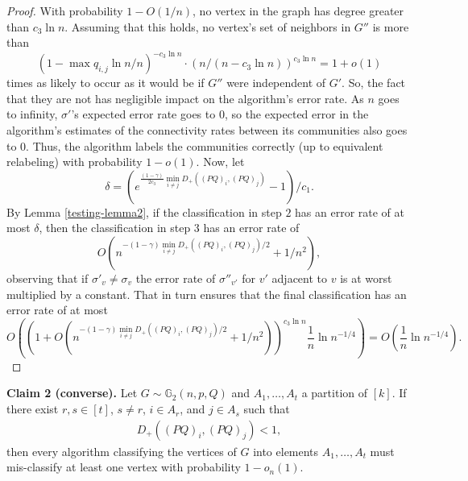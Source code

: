 \documentclass[11pt]{article}
\newcommand{\gs}{\mathbb{G}_2}
\newcommand{\dd}{D_+}
\newcommand{\1}{\mathbb{1}}
\begin{document}
\begin{proof}
With probability $1-O(1/n)$, no vertex in the graph has degree greater than $c_3\ln n$. Assuming that this holds, no vertex's set of neighbors in $G''$ is more than $$(1-\max q_{i,j} \ln n/n)^{-c_3\ln n}\cdot (n/(n-c_3\ln n))^{c_3\ln n}=1+o(1)$$ times as likely to occur as it would be if $G''$ were independent of $G'$. So, the fact that they are not has negligible impact on the algorithm's error rate. As $n$ goes to infinity, $\sigma'$'s expected error rate goes to $0$, so the expected error in the algorithm's estimates of the connectivity rates between its communities also goes to $0$. Thus, the algorithm labels the communities correctly (up to equivalent relabeling) with probability $1-o(1)$. Now, let $$\delta=(e^{\frac{(1-\gamma)}{2c_3} \min_{i\ne j} \dd((PQ)_i,(PQ)_j)}-1)/c_1.$$ By Lemma \ref{testing-lemma2}, if the classification in step $2$ has an error rate of at most $\delta$, then the classification in step $3$ has an error rate of $$O(n^{- (1-\gamma)\min_{i\ne j} \dd((PQ)_i,(PQ)_j)/2}+1/n^2),$$ observing that if $\sigma'_v\ne \sigma_v$ the error rate of $\sigma''_{v'}$ for $v'$ adjacent to $v$ is at worst multiplied by a constant. That in turn ensures that the final classification has an error rate of at most \[O\left((1+O(n^{- (1-\gamma)\min_{i\ne j} \dd((PQ)_i,(PQ)_j)/2}+1/n^2))^{c_3\ln n} \frac{1}{n}\ln{n}^{-1/4}\right)=O\left(\frac{1}{n}\ln n^{-1/4}\right) .\]
\end{proof}

\noindent
{\bf Claim 2 (converse).} Let $G \sim \gs(n,p,Q)$ and $A_1,\dots,A_t$ a partition of $[k]$. If there exist $r,s \in [t]$, $s\neq r$, $i \in A_r$, and $j \in A_s$ such that 
\begin{align}
\dd ((PQ)_i , (PQ)_j) < 1, 
\end{align}
then every algorithm classifying the vertices of $G$ into elements $A_1,\dots,A_t$ must mis-classify at least one vertex with probability $1-o_n(1)$.
\end{document}

